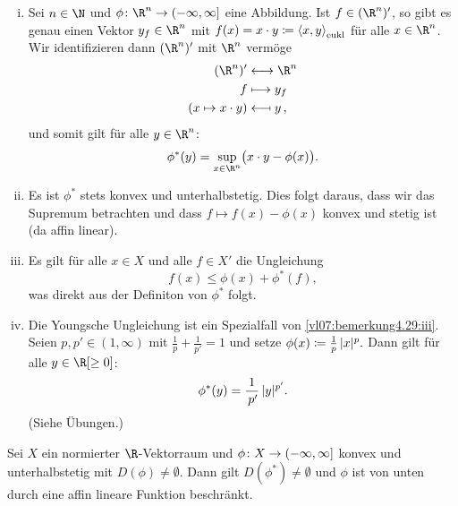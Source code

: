 \begin{thBemerkung}\hfill
    \begin{enumerate}[(i)]
        \item 
            Sei $n\in\N$ und $\phi\colon\R^n\to\neginfinfoc$ eine Abbildung.
            Ist $f\in(\R^n)'$, so gibt es genau einen Vektor $y_f\in\R^n$ mit
            $f(x) = x\cdot y \coloneqq \left\langle x,y\right\rangle_{\mathrm{eukl}}$ für alle $x\in\R^n$.
            Wir identifizieren dann $(\R^n)'$ mit $\R^n$ vermöge
            \begin{align*}
                (\R^n)' &\longleftrightarrow \R^n    \\
                f &\longmapsto y_f              \\
                (x\mapsto x\cdot y) &\longmapsfrom y
            \,, \end{align*}
            und somit gilt für alle $y\in\R^n$:
            \[ \phi^\ast(y) = \sup_{x\in\R^n} \bigl( x\cdot y - \phi(x) \bigr)
            . \]
            
        \item
            Es ist $\phi^\ast$ stets konvex und unterhalbstetig. Dies folgt 
            daraus, dass wir das Supremum betrachten und dass
            $f\mapsto f(x)-\phi(x)$ konvex und stetig ist (da affin linear).
            
        \item \label{vl07:bemerkung4.29:iii}
            Es gilt für alle $x\in X$ und alle $f\in X'$ die Ungleichung
            \[ f(x) \leq \phi(x) + \phi^\ast(f)     , \]
            was direkt aus der Definiton von $\phi^\ast$ folgt.
            
        \item
            Die Youngsche Ungleichung 
            ist ein Spezialfall von \ref{vl07:bemerkung4.29:iii}.
            Seien $p,p'\in(1,\infty)$ mit $\frac{1}{p}+\frac{1}{p'}=1$ und setze
            $\phi(x) \coloneqq \frac{1}{p} \, \lvert x\rvert^p  . $
            Dann gilt für alle $y\in\R[\geq0]$:
            \[ \phi^\ast(y) = \frac{1}{\mkern3mu p'} \, \lvert y\rvert^{p'}  . \]
            (Siehe Übungen.)
    \end{enumerate}
\end{thBemerkung}

\begin{thTheorem} \label{vl07:theorem4.30}
    Sei $X$ ein normierter $\R$-Vektorraum und $\phi\colon X\to(-\infty,\infty]$
    konvex und unterhalbstetig mit $D(\phi)\neq\emptyset$. Dann gilt
    $D(\phi^\ast)\neq\emptyset$ und $\phi$ ist von unten durch eine affin
    lineare Funktion beschränkt.
\end{thTheorem}

